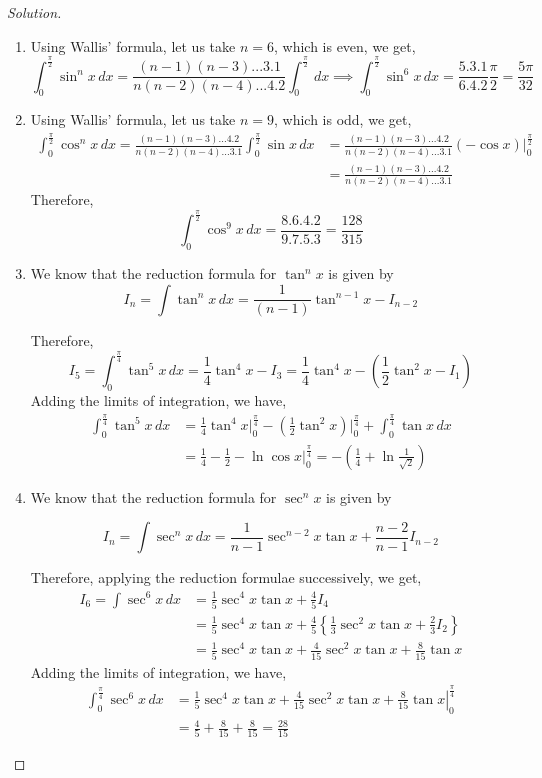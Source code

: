 \documentclass{book}
\theoremstyle{definition}
\newenvironment{solution}
    {\begin{proof}[Solution]}
    {\end{proof}}
\begin{document}
\begin{solution}
\begin{enumerate}[label=(\roman*)]

\item Using Wallis' formula, let us take $n=6$, which is even, we get,
\[
\int_0^{\frac{\pi}{2}}\sin^nx\,dx = \frac{(n-1)(n-3)...3.1}{n(n-2)(n-4)...4.2} \int_0^{\frac{\pi}{2}}\,dx \implies \int_0^{\frac{\pi}{2}}\sin^6x\,dx=\frac{5.3.1}{6.4.2}\frac{\pi}{2}=\frac{5\pi}{32}
\]     

\item Using Wallis' formula, let us take $n=9$, which is odd, we get,
\begin{align*}
\int_0^{\frac{\pi}{2}}\cos^nx\,dx = \frac{(n-1)(n-3)...4.2}{n(n-2)(n-4)...3.1} \int_0^{\frac{\pi}{2}}\sin x\,dx &= \frac{(n-1)(n-3)...4.2}{n(n-2)(n-4)...3.1}\left.(-\cos x)\right\vert_0^{\frac{\pi}{2}}\\
&=\frac{(n-1)(n-3)...4.2}{n(n-2)(n-4)...3.1}    
\end{align*}
Therefore,
\[
\int_0^{\frac{\pi}{2}}\cos^9x\,dx=\frac{8.6.4.2}{9.7.5.3}=\frac{128}{315}
\]

\item We know that the reduction formula for $\tan^n x$ is given by 
\[
I_n=\int\tan^n x\,dx=\frac{1}{(n-1)}\tan^{n-1}x-I_{n-2}
\]

Therefore, 
\[
I_5 = \int_0^{\frac{\pi}{4}}\tan^5 x\,dx = \frac{1}{4}\tan^4x - I_3 = \frac{1}{4}\tan^4x - \left(\frac{1}{2}\tan^2x - I_1\right)
\]
Adding the limits of integration, we have,
\begin{align*}
\int_0^{\frac{\pi}{4}}\tan^5 x\,dx &= \frac{1}{4}\tan^4x\vert_0^{\frac{\pi}{4}} - (\frac{1}{2}\tan^2x)\vert_0^{\frac{\pi}{4}}+\int_0^{\frac{\pi}{4}}\tan x\,dx \\
&= \frac{1}{4}-\frac{1}{2}-\ln\cos x\vert_0^{\frac{\pi}{4}}=-\left(\frac{1}{4}+\ln\frac{1}{\sqrt{2}}\right) 
\end{align*}

\item We know that the reduction formula for $\sec^n x$ is given by 

\[
I_n=\int\sec^n x\,dx = \frac{1}{n-1}\sec^{n-2}x\tan x+\frac{n-2}{n-1}I_{n-2}
\]

Therefore, applying the reduction formulae successively, we get,
\begin{align*}
I_6 = \int \sec^6 x\,dx &= \frac{1}{5} \sec^4x\tan x + \frac{4}{5}I_4 \\
&= \frac{1}{5} \sec^4x\tan x + \frac{4}{5}\left\{\frac{1}{3}\sec^2x\tan x+\frac{2}{3}I_2\right\} \\
&= \frac{1}{5} \sec^4x\tan x + \frac{4}{15}\sec^2x\tan x + \frac{8}{15}\tan x
\end{align*}
Adding the limits of integration, we have,
\begin{align*}
\int_0^{\frac{\pi}{4}}\sec^6x\,dx &= \left.\frac{1}{5} \sec^4x\tan x + \frac{4}{15}\sec^2x\tan x + \frac{8}{15}\tan x\right\vert_0^{\frac{\pi}{4}} \\
&= \frac{4}{5} + \frac{8}{15} + \frac{8}{15} = \frac{28}{15}
\end{align*}


\end{enumerate}
\end{solution}
\end{document}
